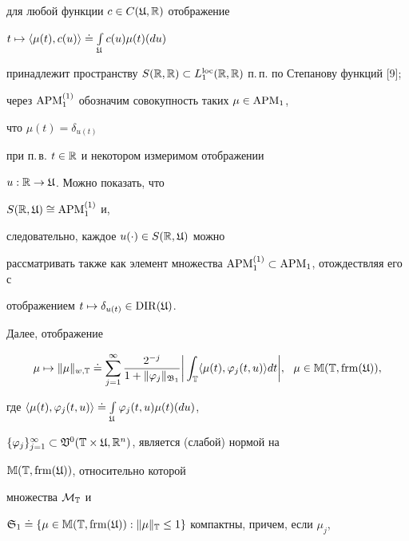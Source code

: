 для любой функции $c\in C(\frak U,\Bbb R)$ отображение


$t\mapsto\langle \mu(t),c(u)


\rangle\doteq\int\limits_{\frak U}c(u)\mu(t)(du)$


принадлежит пространству $S(\bR,\bR)


\subset L_{1}^{\loc}(\bR,\bR)$ п.\,п. по Степанову функций [9];


через $\operatorname{APM}_1^{(1)}$ обозначим совокупность таких $\mu\in\operatorname{APM}_1$,


что $\mu(t)=\delta_{u(t)}$


при п.\,в. $t\in\Bbb R$ и некотором измеримом отображении


$u:\Bbb R\to\frak U$. Можно показать, что


$S(\Bbb R,\frak U)\cong\operatorname{APM}_1^{(1)}$ и,


следовательно, каждое $u(\cdot)\in S(\Bbb R,\frak U)$ можно


рассматривать также как элемент множества $\APM_1^{(1)}


\subset\APM_1$, отождествляя его с


отображением $t\mapsto\delta_{u(t)}\in\operatorname{DIR}(\frak U)$.





Далее, отображение


\begin{equation}


\mu\mapsto\|\mu\|_{w,\bT}\doteq\sum_{j=1}^\infty


\frac{2^{-j}}{1+\|\varphi_j\|_{\frak B_1}}


\bigg|\int_{\bT}\langle\mu(t),\varphi_{j}(t,u)\rangle dt\bigg|,


\ \ \mu\in\Bbb M(\bT,\frm(\frak U)),


\end{equation}


где $\langle\mu(t),\varphi_{j}(t,u)\rangle\doteq


\int\limits_{\frak U}\varphi_{j}(t,u)\mu(t)(du)$,


$\{\varphi_j\}_{j=1}^\infty\subset\frak V^0(\bT\times


\frak U,\bR^n)$, является (слабой) нормой на


$\Bbb M(\Bbb T,\operatorname{frm}(\frak U))$, относительно которой


множества $\cal M_{\Bbb T}$ и


$\frak S_1\doteq\{\mu\in\Bbb M(\bT,\frm(\frak U)):


\|\mu\|_{\bT}\le1\}$ компактны, причем, если $\mu_j$, 


